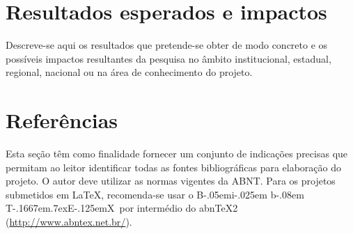 \documentclass[a4paper,12pt]{article}
\def\BibTeX{{\rm B\kern-.05em{\sc i\kern-.025em b}\kern-.08em
    T\kern-.1667em\lower.7ex\hbox{E}\kern-.125emX}}
\begin{document}
\section{Resultados esperados e impactos}

Descreve-se aqui os resultados que pretende-se obter de modo concreto e os
possíveis impactos resultantes da pesquisa no âmbito institucional, estadual,
regional, nacional ou na área de conhecimento do projeto.

\section*{Referências}

Esta seção têm como finalidade fornecer um conjunto de indicações precisas que
permitam ao leitor identificar todas as fontes bibliográficas para elaboração
do projeto. O autor deve utilizar as normas vigentes da ABNT. Para os projetos
submetidos em \LaTeX, recomenda-se usar o \BibTeX\ por intermédio do abn\TeX2
(\url{http://www.abntex.net.br/}).
%
%
\end{document}
